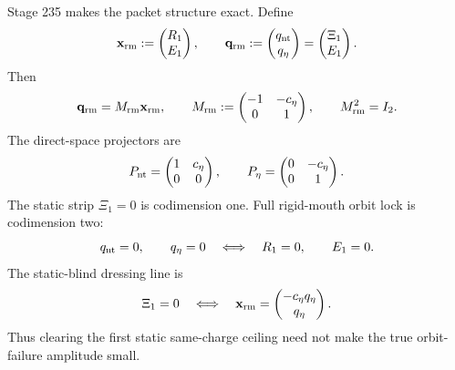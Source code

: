 Stage 235 makes the packet structure exact.  Define
\begin{equation}
\label{eq:app-part07-rigid-mouth-direct-vector}
\mathbf x_{\rm rm}:=\begin{pmatrix}R_1\\E_1\end{pmatrix},
\qquad
\mathbf q_{\rm rm}:=\begin{pmatrix}q_{\rm nt}\\q_\eta\end{pmatrix}
=\begin{pmatrix}\Xi_1\\E_1\end{pmatrix}.
\end{equation}
Then
\begin{equation}
\label{eq:app-part07-mrm}
\mathbf q_{\rm rm}=M_{\rm rm}\mathbf x_{\rm rm},
\qquad
M_{\rm rm}:=\begin{pmatrix}-1&-c_\eta\\0&1\end{pmatrix},
\qquad
M_{\rm rm}^2=I_2.
\end{equation}
The direct-space projectors are
\begin{equation}
\label{eq:app-part07-direct-projectors}
P_{\rm nt}=\begin{pmatrix}1&c_\eta\\0&0\end{pmatrix},
\qquad
P_\eta=\begin{pmatrix}0&-c_\eta\\0&1\end{pmatrix}.
\end{equation}
The static strip \(\Xi_1=0\) is codimension one.  Full rigid-mouth orbit lock is codimension two:
\begin{equation}
\label{eq:app-part07-rm-codim-two}
q_{\rm nt}=0,
\qquad
q_\eta=0
\quad\Longleftrightarrow\quad
R_1=0,
\qquad
E_1=0.
\end{equation}
The static-blind dressing line is
\begin{equation}
\label{eq:app-part07-static-blind-line}
\Xi_1=0
\quad\Longleftrightarrow\quad
\mathbf x_{\rm rm}=\begin{pmatrix}-c_\eta q_\eta\\q_\eta\end{pmatrix}.
\end{equation}
Thus clearing the first static same-charge ceiling need not make the true orbit-failure amplitude small.

